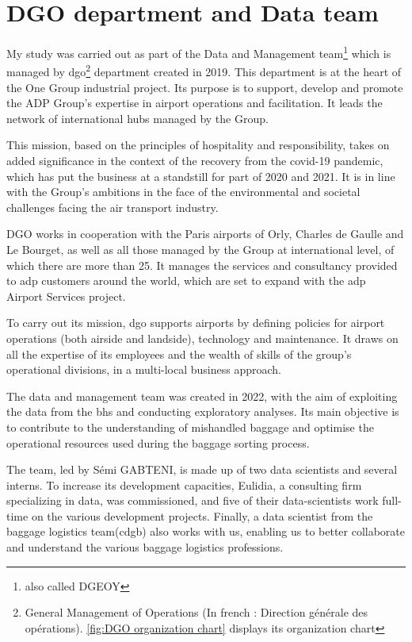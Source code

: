 \documentclass[12pt]{article}
\begin{document}
\section{DGO department and Data team}\label{sec:DGO department and Data team}

My study was carried out as part of the Data and Management team\footnote{also called DGEOY} which is managed by \acrshort{dgo}\footnote{General Management of Operations (In french : Direction générale des opérations). \autoref{fig:DGO organization chart} displays its organization chart} department created in 2019. This department is at the heart of the One Group industrial project. Its purpose is to support, develop and promote the ADP Group's expertise in airport operations and facilitation. It leads the network of international hubs managed by the Group.

This mission, based on the principles of hospitality and responsibility, takes on added significance in the context of the recovery from the covid-19 pandemic, which has put the business at a standstill for part of 2020 and 2021. It is in line with the Group's ambitions in the face of the environmental and societal challenges facing the air transport industry.

DGO works in cooperation with the Paris airports of Orly, Charles de Gaulle and Le Bourget, as well as all those managed by the Group at international level, of which there are more than 25. It manages the services and consultancy provided to \acrshort{adp} customers around the world, which are set to expand with the \acrshort{adp} Airport Services project.

To carry out its mission, \acrshort{dgo} supports airports by defining policies for airport operations (both airside and landside), technology and maintenance. It draws on all the expertise of its employees and the wealth of skills of the group's operational divisions, in a multi-local business approach. \hfill \break


The data and management team was created in 2022, with the aim of exploiting the data from the \acrshort{bhs} and conducting exploratory analyses. Its main objective is to contribute to the understanding of mishandled baggage and optimise the operational resources used during the baggage sorting process.

The team, led by Sémi GABTENI, is made up of two data scientists and several interns. To increase its development capacities, Eulidia, a consulting firm specializing in data, was commissioned, and five of their data-scientists work full-time on the various development projects. Finally, a data scientist from the baggage logistics team(\acrshort{cdgb})  also works with us, enabling us to better collaborate and understand the various baggage logistics professions.
\end{document}
